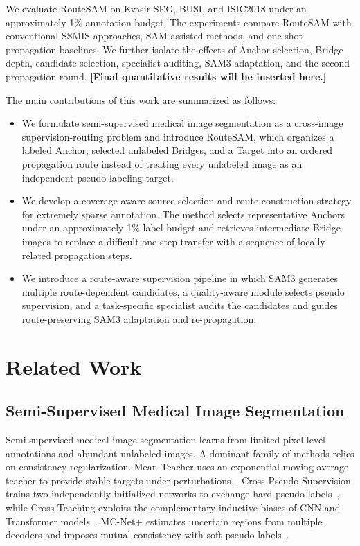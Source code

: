 \documentclass[a4paper,fleqn]{cas-dc}
\begin{document}
We evaluate RouteSAM on Kvasir-SEG, BUSI, and ISIC2018 under an approximately 1\% annotation budget. The experiments compare RouteSAM with conventional SSMIS approaches, SAM-assisted methods, and one-shot propagation baselines. We further isolate the effects of Anchor selection, Bridge depth, candidate selection, specialist auditing, SAM3 adaptation, and the second propagation round. \textbf{[Final quantitative results will be inserted here.]}

The main contributions of this work are summarized as follows:
\begin{itemize}
\item We formulate semi-supervised medical image segmentation as a cross-image supervision-routing problem and introduce RouteSAM, which organizes a labeled Anchor, selected unlabeled Bridges, and a Target into an ordered propagation route instead of treating every unlabeled image as an independent pseudo-labeling target.

\item We develop a coverage-aware source-selection and route-construction strategy for extremely sparse annotation. The method selects representative Anchors under an approximately 1\% label budget and retrieves intermediate Bridge images to replace a difficult one-step transfer with a sequence of locally related propagation steps.

\item We introduce a route-aware supervision pipeline in which SAM3 generates multiple route-dependent candidates, a quality-aware module selects pseudo supervision, and a task-specific specialist audits the candidates and guides route-preserving SAM3 adaptation and re-propagation.
\end{itemize}

\section{Related Work}

\subsection{Semi-Supervised Medical Image Segmentation}

Semi-supervised medical image segmentation learns from limited pixel-level annotations and abundant unlabeled images. A dominant family of methods relies on consistency regularization. Mean Teacher uses an exponential-moving-average teacher to provide stable targets under perturbations~\cite{tarvainen2017meanteacher}. Cross Pseudo Supervision trains two independently initialized networks to exchange hard pseudo labels~\cite{chen2021cps}, while Cross Teaching exploits the complementary inductive biases of CNN and Transformer models~\cite{luo2022crossteaching}. MC-Net+ estimates uncertain regions from multiple decoders and imposes mutual consistency with soft pseudo labels~\cite{wu2022mcnet}.
\end{document}
